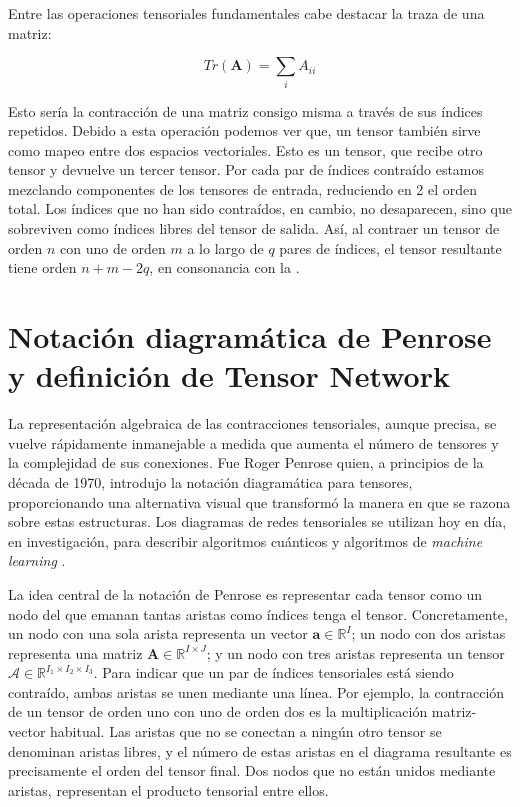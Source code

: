 Entre las operaciones tensoriales fundamentales cabe destacar la traza de una matriz:

\begin{equation}
    Tr(\mathbf{A}) = \sum_{i}A_{ii}
\end{equation}

Esto sería la contracción de una matriz consigo misma a través de sus índices repetidos. Debido a esta operación podemos ver que, un tensor también sirve como mapeo entre dos espacios vectoriales. Esto es un tensor, que recibe otro tensor y devuelve un tercer tensor. Por cada par de índices contraído estamos mezclando componentes de los tensores de entrada, reduciendo en 2 el orden total. Los índices que no han sido contraídos, en cambio, no desaparecen, sino que sobreviven como índices libres del tensor de salida. Así, al contraer un tensor de orden $n$ con uno de orden $m$ a lo largo de $q$ pares de índices, el tensor resultante tiene orden $n + m - 2q$, en consonancia con la .

\section{Notación diagramática de Penrose y definición de Tensor Network}

La representación algebraica de las contracciones tensoriales, aunque precisa, se vuelve rápidamente inmanejable a medida que aumenta el número de tensores y la complejidad de sus conexiones. Fue Roger Penrose  quien, a principios de la década de 1970, introdujo la notación diagramática para tensores, proporcionando una alternativa visual que transformó la manera en que se razona sobre estas estructuras. Los diagramas de redes tensoriales se utilizan hoy en día, en investigación, para describir algoritmos cuánticos y algoritmos de \textit{machine learning} .

La idea central de la notación de Penrose es representar cada tensor como un nodo del que emanan tantas aristas como índices tenga el tensor. Concretamente, un nodo con una sola arista representa un vector $\mathbf{a} \in \mathbb{R}^I$; un nodo con dos aristas representa una matriz $\mathbf{A} \in \mathbb{R}^{I \times J}$; y un nodo con tres aristas representa un tensor $\boldsymbol{\mathcal{A}} \in \mathbb{R}^{I_1 \times I_2 \times I_3}$. Para indicar que un par de índices tensoriales está siendo contraído, ambas aristas se unen mediante una línea. Por ejemplo, la contracción de un tensor de orden uno con uno de orden dos es la multiplicación matriz-vector habitual. Las aristas que no se conectan a ningún otro tensor se denominan aristas libres, y el número de estas aristas en el diagrama resultante es precisamente el orden del tensor final. Dos nodos que no están unidos mediante aristas, representan el producto tensorial entre ellos.

